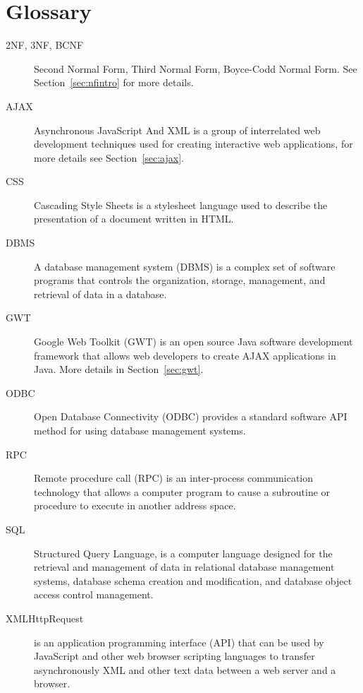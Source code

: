 \section{Glossary}
\begin{description}
	\item[2NF, 3NF, BCNF] Second Normal Form, Third Normal Form, Boyce-Codd Normal Form. See Section~\ref{sec:nfintro} for more details.
	\item[AJAX] Asynchronous JavaScript And XML is a group of interrelated web development techniques used for creating interactive web applications, for more details see Section~\ref{sec:ajax}.
	\item[CSS] Cascading Style Sheets is a stylesheet language used to describe the presentation of a document written in HTML.
	\item[DBMS] A database management system (DBMS) is a complex set of software programs that controls the organization, storage, management, and retrieval of data in a database.
	\item[GWT] Google Web Toolkit (GWT) is an open source Java software development framework that allows web developers to create AJAX applications in Java. More details in Section~\ref{sec:gwt}.
	\item[ODBC] Open Database Connectivity (ODBC) provides a standard software API method for using database management systems.
	\item[RPC] Remote procedure call (RPC) is an inter-process communication technology that allows a computer program to cause a subroutine or procedure to execute in another address space.
	\item[SQL] Structured Query Language, is a computer language designed for the retrieval and management of data in relational database management systems, database schema creation and modification, and database object access control management.
	\item[XMLHttpRequest] is an application programming interface (API) that can be used by JavaScript and other web browser scripting languages to transfer asynchronously XML and other text data between a web server and a browser.
\end{description}
